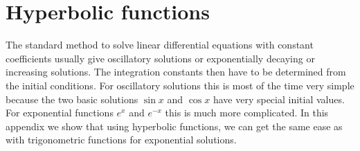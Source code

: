 %
%
%
\chapter{Hyperbolic functions}
The standard method to solve linear differential equations with constant
coefficients usually give oscillatory solutions or exponentially
decaying or increasing solutions.
The integration constants then have to be determined from the initial
conditions.
For oscillatory solutions this is most of the time very simple because
the two basic solutions $\sin x$ and $\cos x$ have very special 
initial values.
For exponential functions $e^x$ and $e^{-x}$ this is much more
complicated.
In this appendix we show that using hyperbolic functions, we can
get the same ease as with trigonometric functions for exponential
solutions.



